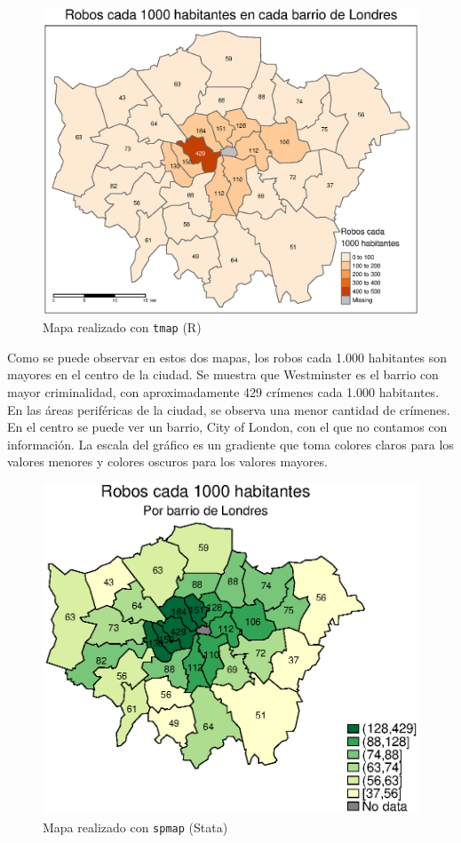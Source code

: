 \documentclass[12pt]{article}
\begin{document}
\begin{figure}[H]
    \centering
    \includegraphics[width = \textwidth] {graficos/mapa_tmap.eps}
    \caption{Mapa realizado con \texttt{tmap} (R)}
    \label{crimtmap}
\end{figure}

Como se puede observar en estos dos mapas, los robos cada 1.000 habitantes son mayores en el centro de la ciudad. Se muestra que Westminster es el barrio con mayor criminalidad, con aproximadamente 429 cr\'imenes cada 1.000 habitantes. En las \'areas perif\'ericas de la ciudad, se observa una menor cantidad de cr\'imenes. En el centro se puede ver un barrio, City of London, con el que no contamos con informaci\'on. La escala del gr\'afico es un gradiente que toma colores claros para los valores menores y colores oscuros para los valores mayores. 

\begin{figure}[H]
    \centering
    \includegraphics[width = \textwidth]{graficos/mapa_stata.eps}
    \caption{Mapa realizado con \texttt{spmap} (Stata)}
    \label{crimstata}
\end{figure}
\end{document}
